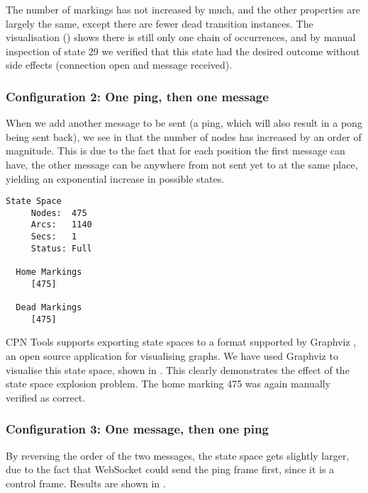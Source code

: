 	The number of markings has not increased by much, and the other properties are
	largely the same, except there are fewer dead transition instances. 
	The visualisation () shows there is still only one
	chain of occurrences, and by manual inspection of state 29 we verified that
	this state had the desired outcome without side effects (connection open and
	message received).
	
	\subsubsection{Configuration 2: One ping, then one message}
	When we add another message to be sent (a ping, which will also result in a
	pong being sent back), we see in  that the number of nodes
	has increased by an order of magnitude. This is due to the fact that for each
	position the first message can have, the other message can be
	anywhere from not sent yet to at the same place, yielding an exponential
	increase in possible states.
	
	\begin{lstlisting}[language={},float,label=lst:ssa_ping_msg,caption=One ping
	then one message]
  State Space
     Nodes:  475
     Arcs:   1140
     Secs:   1
     Status: Full
     
  Home Markings
     [475]

  Dead Markings
     [475]
	\end{lstlisting}
	
	CPN Tools supports exporting state spaces to a format supported by Graphviz
	\cite{ellson2002graphviz}, an open source application for visualising graphs.
	We have used Graphviz to visualise this state space, shown in
	. This clearly demonstrates the effect of the
	state space explosion problem.
		The home marking 475 was again manually verified as correct.
	

	\subsubsection{Configuration 3: One message, then one ping}
	By reversing the order of the two messages, the state space gets slightly
	larger, due to the fact that WebSocket could send the ping frame first, since
	it is a control frame. Results are shown in .
	
